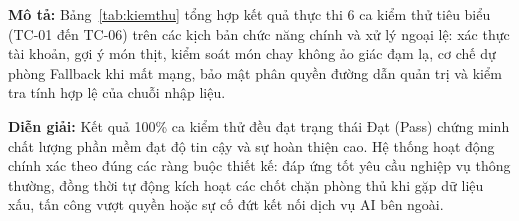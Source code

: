 \noindent\textbf{Mô tả:} Bảng~\ref{tab:kiemthu} tổng hợp kết quả thực thi 6 ca kiểm thử tiêu biểu (TC-01 đến TC-06) trên các kịch bản chức năng chính và xử lý ngoại lệ: xác thực tài khoản, gợi ý món thịt, kiểm soát món chay không ảo giác đạm lạ, cơ chế dự phòng Fallback khi mất mạng, bảo mật phân quyền đường dẫn quản trị và kiểm tra tính hợp lệ của chuỗi nhập liệu.

\noindent\textbf{Diễn giải:} Kết quả 100\% ca kiểm thử đều đạt trạng thái Đạt (Pass) chứng minh chất lượng phần mềm đạt độ tin cậy và sự hoàn thiện cao. Hệ thống hoạt động chính xác theo đúng các ràng buộc thiết kế: đáp ứng tốt yêu cầu nghiệp vụ thông thường, đồng thời tự động kích hoạt các chốt chặn phòng thủ khi gặp dữ liệu xấu, tấn công vượt quyền hoặc sự cố đứt kết nối dịch vụ AI bên ngoài.
